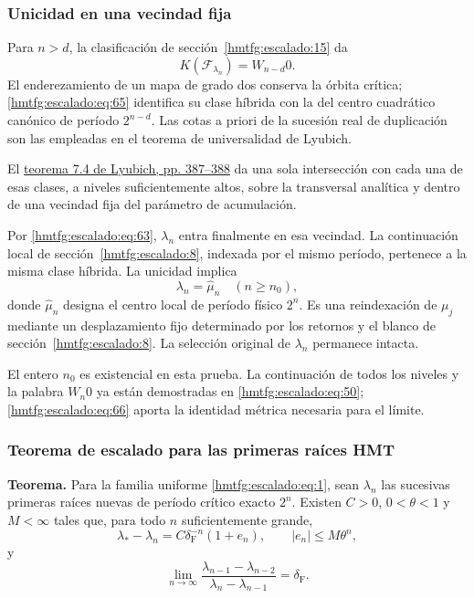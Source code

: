 \subsubsection{Unicidad en una vecindad fija}
\label{hmtfg:escalado:17.2}

Para \(n>d\), la clasificación de sección~\ref{hmtfg:escalado:15} da
\begin{equation}
K(\mathcal F_{\lambda_n})=W_{n-d}0.
\label{hmtfg:escalado:eq:65}
\end{equation}
El enderezamiento de un mapa de grado dos conserva la órbita crítica; \eqref{hmtfg:escalado:eq:65} identifica su clase híbrida con la del centro cuadrático canónico de período \(2^{n-d}\). Las cotas a priori de la sucesión real de duplicación son las empleadas en el teorema de universalidad de Lyubich.

El \href{https://www.maths.tcd.ie/EMIS/journals/Annals/149_2/lyubich.pdf\#page=69}{teorema 7.4 de Lyubich, pp. 387–388} da una sola intersección con cada una de esas clases, a niveles suficientemente altos, sobre la transversal analítica y dentro de una vecindad fija del parámetro de acumulación.

Por \eqref{hmtfg:escalado:eq:63}, \(\lambda_n\) entra finalmente en esa vecindad. La continuación local de sección~\ref{hmtfg:escalado:8}, indexada por el mismo período, pertenece a la misma clase híbrida. La unicidad implica
\begin{equation}
\boxed{\lambda_n=\widehat\mu_n\quad(n\ge n_0),}
\label{hmtfg:escalado:eq:66}
\end{equation}
donde \(\widehat\mu_n\) designa el centro local de período físico \(2^n\). Es una reindexación de \(\mu_j\) mediante un desplazamiento fijo determinado por los retornos y el blanco de sección~\ref{hmtfg:escalado:8}. La selección original de \(\lambda_n\) permanece intacta.

El entero \(n_0\) es existencial en esta prueba. La continuación de todos los niveles y la palabra \(W_n0\) ya están demostradas en \eqref{hmtfg:escalado:eq:50}; \eqref{hmtfg:escalado:eq:66} aporta la identidad métrica necesaria para el límite.

\subsubsection{Teorema de escalado para las primeras raíces HMT}
\label{hmtfg:escalado:17.3}

\textbf{Teorema.} Para la familia uniforme \eqref{hmtfg:escalado:eq:1}, sean \(\lambda_n\) las sucesivas primeras raíces nuevas de período crítico exacto \(2^n\). Existen \(C>0\), \(0<\theta<1\) y \(M<\infty\) tales que, para todo \(n\) suficientemente grande,
\begin{equation}
\lambda_*-\lambda_n=C\delta_{\mathrm F}^{-n}(1+e_n),
\qquad |e_n|\le M\theta^n,
\label{hmtfg:escalado:eq:67}
\end{equation}
y
\begin{equation}
\boxed{\lim_{n\to\infty}
\frac{\lambda_{n-1}-\lambda_{n-2}}
{\lambda_n-\lambda_{n-1}}=\delta_{\mathrm F}.}
\label{hmtfg:escalado:eq:68}
\end{equation}

